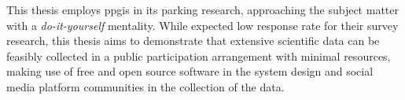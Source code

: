 This thesis employs \acrshort{ppgis} in its parking research, approaching the subject matter with a \textit{do-it-yourself} mentality. While  expected low response rate for their survey research, this thesis aims to demonstrate that extensive scientific data can be feasibly collected in a public participation arrangement with minimal resources, making use of free and open source software in the system design and social media platform communities in the collection of the data.